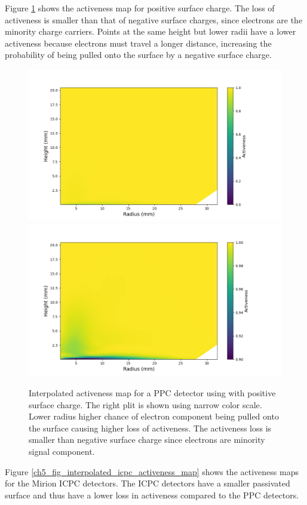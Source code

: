 Figure \ref{ch5_fig_interpolated_activeness_map_pos} shows the activeness map for positive surface charge. The loss of activeness is smaller than that of negative surface charges, since electrons are the minority charge carriers. Points at the same height but lower radii have a lower activeness because electrons must travel a longer distance, increasing the probability of being pulled onto the surface by a negative surface charge.

\begin{figure}%
\centering
\includegraphics[trim={1.5cm 0cm 3.3cm 1cm},clip,width=0.49\linewidth]{ch5/figs/activeness_map_cubic_sc=0.3_ponama_1_5000_linear_full.png}
\includegraphics[trim={1.5cm 0cm 3.3cm 1cm},clip,width=0.49\linewidth]{ch5/figs/activeness_map_cubic_sc=0.3_ponama_1_5000_linear.png}
\caption{Interpolated activeness map for a PPC detector using \ehd with positive surface charge. The right plit is shown using narrow color scale. Lower radius higher chance of electron component being pulled onto the surface causing higher loss of activeness. The activeness loss is smaller than negative surface charge since electrons are minority signal component.}
\label{ch5_fig_interpolated_activeness_map_pos}
\end{figure}

Figure \ref{ch5_fig_interpolated_icpc_activeness_map} shows the activeness maps for the Mirion ICPC detectors. The ICPC detectors have a smaller passivated surface and thus have a lower loss in activeness compared to the PPC detectors. 

